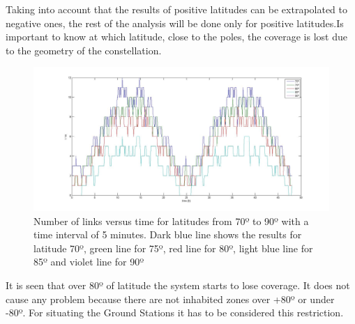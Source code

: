 Taking into account that the results of positive latitudes can be extrapolated to negative ones, the rest of the analysis will be done only for positive latitudes.Is important to know at which latitude, close to the poles, the coverage is lost due to the geometry of the constellation.
\begin{figure}[H]
\begin{center}
\includegraphics[scale=0.30]{70_5_90_lat.jpg}
\caption[Links vs time for latitudes from 70º to 90º]{Number of links versus time for latitudes from 70º to 90º with a time interval of 5 minutes. Dark blue line shows the results for latitude 70º, green line for 75º, red line for 80º, light blue line for 85º and violet line for 90º}
\label{fig:lat3}
\end{center}
\end{figure}
It is seen that over 80º of latitude the system starts to lose coverage. It does not cause any problem because there are not inhabited zones over +80º or under -80º. For situating the Ground Stations it has to be considered this restriction.

